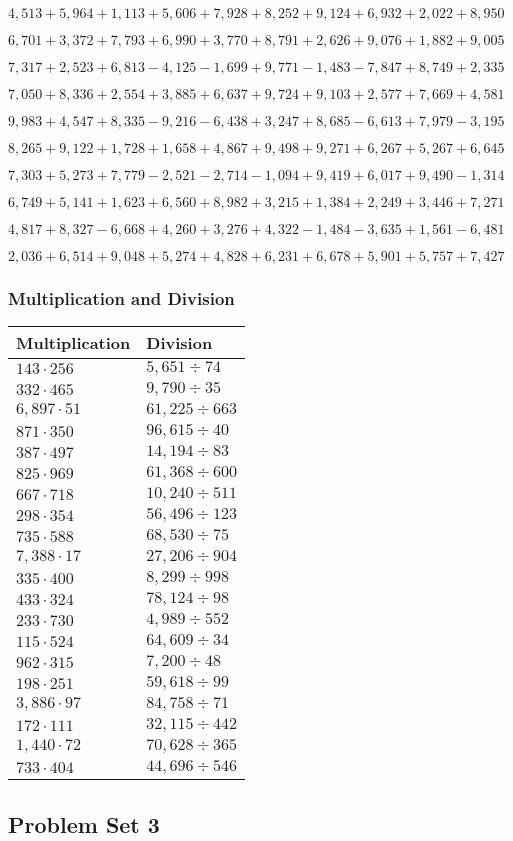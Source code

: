 \(4,513+5,964+1,113+5,606+7,928+8,252+9,124+6,932+2,022+ 8,950\)

\(6,701+3,372+7,793+6,990+3,770+8,791+2,626+9,076+1,882+9,005\)

\(7,317+2,523+6,813-4,125-1,699+9,771-1,483-7,847+8,749+2,335\)

\(7,050+8,336+2,554+3,885+6,637+9,724+9,103+2,577+7,669+4,581\)

\(9,983+4,547+8,335-9,216-6,438+3,247+8,685-6,613+7,979-3,195\)

\(8,265+9,122+1,728+1,658+4,867+9,498+9,271+6,267+5,267+6,645\)

\(7,303+5,273+7,779-2,521-2,714-1,094+9,419+6,017+9,490-1,314\)

\(6,749+5,141+1,623+6,560+8,982+3,215+1,384+2,249+3,446+7,271\)

\(4,817+8,327-6,668+4,260+3,276+4,322-1,484-3,635+1,561-6,481\)

\(2,036+6,514+9,048+5,274+4,828+6,231+6,678+5,901+5,757+7,427\)

\hypertarget{multiplication-and-division-163}{%
\subsubsection{Multiplication and
Division}\label{multiplication-and-division-163}}

\begin{longtable}[]{@{}ll@{}}
\toprule
Multiplication & Division\tabularnewline
\midrule
\endhead
\(143\cdot256\) & \(5,651÷74\)\tabularnewline
\(332\cdot465\) & \(9,790÷35\)\tabularnewline
\(6,897\cdot51\) & \(61,225÷663\)\tabularnewline
\(871\cdot350\) & \(96,615÷40\)\tabularnewline
\(387\cdot497\) & \(14,194÷83\)\tabularnewline
\(825\cdot969\) & \(61,368÷600\)\tabularnewline
\(667\cdot718\) & \(10,240÷511\)\tabularnewline
\(298\cdot354\) & \(56,496÷123\)\tabularnewline
\(735\cdot588\) & \(68,530÷75\)\tabularnewline
\(7,388\cdot17\) & \(27,206÷904\)\tabularnewline
\(335\cdot400\) & \(8,299÷998\)\tabularnewline
\(433\cdot324\) & \(78,124÷98\)\tabularnewline
\(233\cdot730\) & \(4,989÷552\)\tabularnewline
\(115\cdot524\) & \(64,609÷34\)\tabularnewline
\(962\cdot315\) & \(7,200÷48\)\tabularnewline
\(198\cdot251\) & \(59,618÷99\)\tabularnewline
\(3,886\cdot97\) & \(84,758÷71\)\tabularnewline
\(172\cdot111\) & \(32,115÷442\)\tabularnewline
\(1,440\cdot72\) & \(70,628÷365\)\tabularnewline
\(733\cdot404\) & \(44,696÷546\)\tabularnewline
\bottomrule
\end{longtable}

\hypertarget{problem-set-3-3}{%
\subsection{Problem Set 3}\label{problem-set-3-3}}

